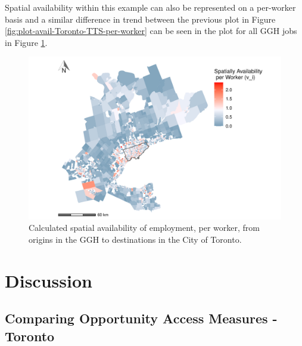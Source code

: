 \documentclass[]{elsarticle} %
\begin{document}
\newpage

Spatial availability within this example can also be represented on a
per-worker basis and a similar difference in trend between the previous
plot in Figure \ref{fig:plot-avail-Toronto-TTS-per-worker} can be seen
in the plot for all GGH jobs in Figure
\ref{fig:plot-avail-GGH-TTS-per-worker}.

\begin{figure}
\includegraphics[width=1\linewidth]{Spatial-Availability_files/figure-latex/plot-avail-GGH-TTS-per-worker-1} \caption{\label{fig:plot-avail-GGH-TTS-per-worker}Calculated spatial availability of employment, per worker, from origins in the GGH to destinations in the City of Toronto.}\label{fig:plot-avail-GGH-TTS-per-worker}
\end{figure}
\newpage

\hypertarget{discussion}{%
\section{Discussion}\label{discussion}}

\hypertarget{comparing-opportunity-access-measures---toronto}{%
\subsection{Comparing Opportunity Access Measures -
Toronto}\label{comparing-opportunity-access-measures---toronto}}
\end{document}
